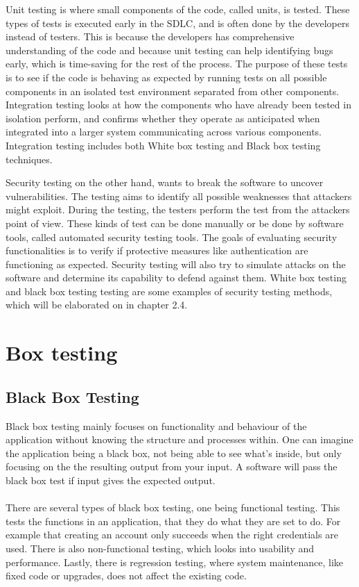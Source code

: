 Unit testing is where small components of the code, called units, is tested. These types of tests is executed early in the SDLC, and is often done by the developers instead of testers. This is because the developers has comprehensive understanding of the code and because unit testing can help identifying bugs early, which is time-saving for the rest of the process. The purpose of these tests is to see if the code is behaving as expected by running tests on all possible components in an isolated test environment separated from other components. Integration testing looks at how the components who have already been tested in isolation perform, and confirms whether they operate as anticipated when integrated into a larger system communicating across various components. Integration testing includes both White box testing and Black box testing techniques.\cite{unitvsintergration}

Security testing on the other hand, wants to break the software to uncover vulnerabilities. The testing aims to identify all possible weaknesses that attackers might exploit. During the testing, the testers perform the test from the attackers point of view. These kinds of test can be done manually or be done by software tools, called automated security testing tools. The goals of evaluating security functionalities is to verify if protective measures like authentication are functioning as expected. Security testing will also try to simulate attacks on the software and determine its capability to defend against them. White box testing and black box testing testing are some examples of security testing methods, which will be elaborated on in chapter 2.4.\cite{whysectest}


\section{Box testing}
\subsection{Black Box Testing}
Black box testing mainly focuses on functionality and behaviour of the application without knowing the structure and processes within. One can imagine the application being a black box, not being able to see what's inside, but only focusing on the the resulting output from your input. A software will pass the black box test if input gives the expected output. \cite{blackbox}
\\~\\
There are several types of black box testing, one being functional testing. This tests the functions in an application, that they do what they are set to do. For example that creating an account only succeeds when the right credentials are used. There is also non-functional testing, which looks into usability and performance. Lastly, there is regression testing, where system maintenance, like fixed code or upgrades, does not affect the existing code. 

